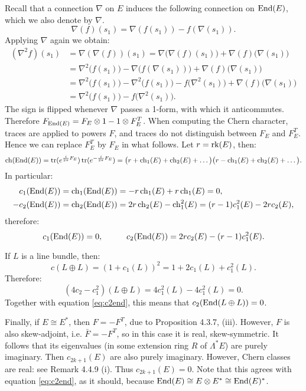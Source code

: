 \documentclass{article}
\begin{document}
Recall that a connection $\nabla$ on $E$ induces the following connection on $\operatorname{End}(E)$, which we also denote by $\nabla$.
\[	\nabla(f) (s_1) = \nabla(f(s_1)) - f(\nabla(s_1)).	\]
Applying $\nabla$ again we obtain:
\begin{align*}
(\nabla^2 f) (s_1) &= \nabla(\nabla(f)) (s_1) = \nabla \big( \nabla(f) (s_1) \big) + \nabla(f) \big(\nabla(s_1)\big) \\
&= \nabla^2\big(f(s_1)\big) - \nabla\big(f(\nabla(s_1))\big) + \nabla(f) \big(\nabla(s_1)\big) \\
&= \nabla^2\big(f(s_1)\big) - \nabla^2\big(f(s_1)\big) - f\big(\nabla^2(s_1)\big) +  \nabla(f) \big(\nabla(s_1)\big) \\
&= \nabla^2\big(f(s_1)\big) - f\big(\nabla^2(s_1)\big).
\end{align*}
The sign is flipped whenever $\nabla$ passes a 1-form, with which it anticommutes. Therefore $F_{\operatorname{End}(E)} = F_E \otimes 1 - 
1 \otimes F_E^T$. When computing the Chern character, traces are applied to powers $F$, and traces do not distinguish
between $F_E$ and $F_E^T$. Hence we can replace $F_E^T$ by $F_E$ in what follows. Let $r=\operatorname{rk}(E)$, then:
\[	\operatorname{ch}(\operatorname{End}(E)) = \operatorname{tr}(e^{\frac{i}{2\pi}F_E}) \operatorname{tr}(e^{-\frac{i}{2\pi}F_E}) = \big(r+ \operatorname{ch}_1(E) +	\operatorname{ch}_2(E) + \dots \big)
\big(r - \operatorname{ch}_1(E) +	\operatorname{ch}_2(E) + \dots \big). \]
In particular:
\begin{align*}
c_1(\operatorname{End}(E)) = \operatorname{ch}_1(\operatorname{End}(E)) &= -r\operatorname{ch}_1(E) + r \operatorname{ch}_1(E) = 0 ,\\
- c_2(\operatorname{End}(E)) = \operatorname{ch}_2(\operatorname{End}(E)) &= 2r \operatorname{ch}_2(E) - \operatorname{ch}_1^2(E) = (r-1) c_1^2(E) - 2r c_2(E) , \\
\end{align*}
therefore:
\begin{equation}
\label{eq:c2end}
c_1(\End(E)) = 0, \hspace{10mm} c_2(\End(E)) = 2r c_2(E) - (r-1)c_1^2(E).
\end{equation}

If $L$ is a line bundle, then:
\[	c(L\oplus L) = (1 + c_1(L))^2 = 1 + 2c_1(L) + c_1^2(L).	\]
Therefore:
\[	(4c_2 - c_1^2)(L\oplus L) = 4c_1^2(L) - 4c_1^2(L) = 0.	\]
Together with equation \ref{eq:c2end}, this means that $c_2(\operatorname{End}(L\oplus L)) = 0$.

Finally, if $E \cong E^*$, then $F = -F^T$, due to Proposition 4.3.7, (iii). However, $F$ is also skew-adjoint,
i.e. $\bar F = - F^T$, so in this case it is real, skew-symmetric. 
It follows that its eigenvalues (in some extension ring $R$ of
$\Lambda^* E$) are purely imaginary. Then $c_{2k+1}(E)$ are also purely imaginary. However, Chern classes are
real: see Remark 4.4.9 (i). Thus $c_{2k+1}(E) = 0$. Note that this agrees with equation \ref{eq:c2end}, as it should,
because $\operatorname{End}(E) \cong E \otimes E^* \cong \operatorname{End}(E)^*$.
\end{document}
